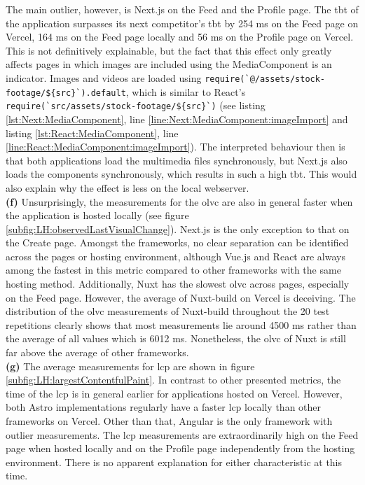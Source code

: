 \documentclass[a4paper, 12pt]{article}
\begin{document}
The main outlier, however, is Next.js on the Feed and the Profile page.
The \acrshort{tbt} of the application surpasses its next competitor's \acrshort{tbt} by 254 ms on the Feed page on Vercel, 164 ms on the Feed page locally and 56 ms on the Profile page on Vercel.
This is not definitively explainable, but the fact that this effect only greatly affects pages in which images are included using the MediaComponent is an indicator.
Images and videos are loaded using \lstinline|require(`@/assets/stock-footage/${src}`).default|, which is similar to React's \lstinline|require(`src/assets/stock-footage/${src}`)| (see listing \ref{lst:Next:MediaComponent}, line \ref{line:Next:MediaComponent:imageImport} and listing \ref{lst:React:MediaComponent}, line \ref{line:React:MediaComponent:imageImport}).
The interpreted behaviour then is that both applications load the multimedia files synchronously, but Next.js also loads the components synchronously, which results in such a high \acrlong{tbt}.
This would also explain why the effect is less on the local webserver.
\\

\textbf{(f)} Unsurprisingly, the measurements for the \acrfull{olvc} are also in general faster when the application is hosted locally (see figure \ref{subfig:LH:observedLastVisualChange}).
Next.js is the only exception to that on the Create page.
Amongst the frameworks, no clear separation can be identified across the pages or hosting environment, although Vue.js and React are always among the fastest in this metric compared to other frameworks with the same hosting method.
Additionally, Nuxt has the slowest \acrshort{olvc} across pages, especially on the Feed page.
However, the average of Nuxt-build on Vercel is deceiving.
The distribution of the \acrshort{olvc} measurements of Nuxt-build throughout the 20 test repetitions clearly shows that most measurements lie around 4500 ms rather than the average of all values which is 6012 ms.
Nonetheless, the \acrshort{olvc} of Nuxt is still far above the average of other frameworks.
\\

\textbf{(g)} The average measurements for \acrfull{lcp} are shown in figure \ref{subfig:LH:largestContentfulPaint}.
In contrast to other presented metrics, the time of the \acrshort{lcp} is in general earlier for applications hosted on Vercel.
However, both Astro implementations regularly have a faster \acrshort{lcp} locally than other frameworks on Vercel.
Other than that, Angular is the only framework with outlier measurements.
The \acrshort{lcp} measurements are extraordinarily high on the Feed page when hosted locally and on the Profile page independently from the hosting environment.
There is no apparent explanation for either characteristic at this time.
\end{document}
